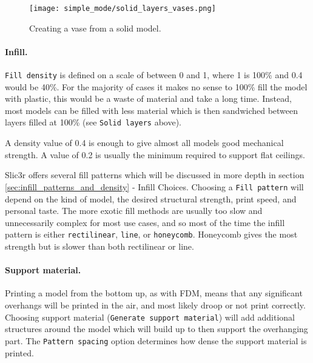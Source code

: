 \begin{figure}[H]
\centering
\texttt{[image: simple\_mode/solid\_layers\_vases.png]}
\caption{Creating a vase from a solid model.}
\label{fig:solid_layers_vases}
\end{figure}


\paragraph{Infill.} %
\label{par:simple_infill}
\texttt{Fill density} is defined on a scale of between 0 and 1, where 1 is 100\% and 0.4 would be 40\%.  For the majority of cases it makes no sense to 100\% fill the model with plastic, this would be a waste of material and take a long time.  Instead, most models can be filled with less material which is then sandwiched between layers filled at 100\% (see \texttt{Solid layers} above).

A density value of 0.4 is enough to give almost all models good mechanical strength.  A value of 0.2 is usually the minimum required to support flat ceilings.

Slic3r offers several fill patterns which will be discussed in more depth in section \ref{sec:infill_patterns_and_density} - Infill Choices.  Choosing a \texttt{Fill pattern} will depend on the kind of model, the desired structural  strength, print speed, and personal taste.  The more exotic fill methods are usually too slow and unnecessarily complex for most use cases, and so most of the time the infill pattern is either \texttt{rectilinear}, \texttt{line}, or \texttt{honeycomb}.  Honeycomb gives the most strength but is slower than both rectilinear or line.


\paragraph{Support material.} %
\label{par:simple_support_material}
Printing a model from the bottom up, as with FDM, means that any significant overhangs will be printed in the air, and most likely droop or not print correctly.  Choosing support material (\texttt{Generate support material}) will add additional structures around the model which will build up to then support the overhanging part.  The \texttt{Pattern spacing} option determines how dense the support material is printed.

